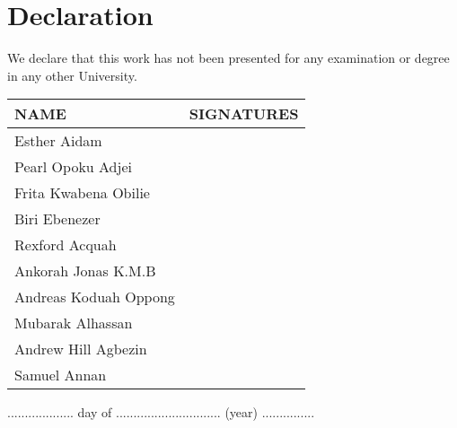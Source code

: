 
\section*{\centering Declaration}


We declare that this work has not been presented for any examination or degree in any other University.


\vspace{1cm}

\begin{tabular}{|l|c |}
	\hline
	NAME & SIGNATURES \\ \hline

	Esther Aidam & \\ \hline
	Pearl Opoku Adjei & \\ \hline
	Frita Kwabena Obilie & \\ \hline
	Biri Ebenezer & 	\\ \hline
	Rexford Acquah & \\ \hline
	Ankorah Jonas K.M.B & \\ \hline
	Andreas Koduah Oppong & \\ \hline
	Mubarak Alhassan & \\ \hline
	Andrew Hill Agbezin & \\ \hline
	Samuel Annan & \\ \hline




\end{tabular}

\vspace{1cm}
................... day of .............................. (year) ...............